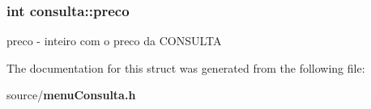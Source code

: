 \subsubsection[{preco}]{\setlength{\rightskip}{0pt plus 5cm}int consulta\+::preco}\label{structconsulta_ab5b958a1a0cedc1059f4a291e8a958c1}
preco -\/ inteiro com o preco da C\+O\+N\+S\+U\+L\+T\+A 

The documentation for this struct was generated from the following file\+:\begin{DoxyCompactItemize}
\item 
source/{\bf menu\+Consulta.\+h}\end{DoxyCompactItemize}
